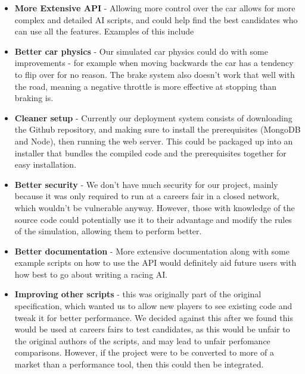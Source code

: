 \begin{itemize}
    \item
        \textbf{More Extensive API} - Allowing more control over the car allows
        for more complex and detailed AI scripts, and could help find the best
        candidates who can use all the features. Examples of this include 
    \item
        \textbf{Better car physics} - Our simulated car physics could do with
        some improvements - for example when moving backwards the car has a
        tendency to flip over for no reason. The brake system also doesn't work
        that well with the road, meaning a negative throttle is more effective
        at stopping than braking is.
    \item
        \textbf{Cleaner setup} - Currently our deployment system consists of
        downloading the Github repository, and making sure to install the
        prerequisites (MongoDB and Node), then running the web server. This
        could be packaged up into an installer that bundles the compiled code
        and the prerequisites together for easy installation.
    \item
        \textbf{Better security} - We don't have much security for our project,
        mainly because it was only required to run at a careers fair in a closed
        network, which wouldn't be vulnerable anyway. However, those with
        knowledge of the source code could potentially use it to their advantage
        and modify the rules of the simulation, allowing them to perform better.
    \item
        \textbf{Better documentation} - More extensive documentation along with
        some example scripts on how to use the API would definitely aid future
        users with how best to go about writing a racing AI.
    \item
        \textbf{Improving other scripts} - this was originally part of the
        original specification, which wanted us to allow new players to see
        existing code and tweak it for better performance. We decided against
        this after we found this would be used at careers fairs to test
        candidates, as this would be unfair to the original authors of the
        scripts, and may lead to unfair perfomance comparisons.
        However, if the project were to be converted to more of a market than a
        performance tool, then this could then be integrated.
\end{itemize}
